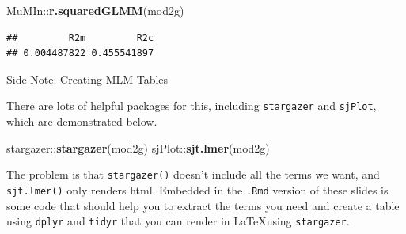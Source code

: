\documentclass[ignorenonframetext,]{beamer}
\newenvironment{Shaded}{\begin{snugshade}}{\end{snugshade}}
\newcommand{\KeywordTok}[1]{\textcolor[rgb]{0.13,0.29,0.53}{\textbf{{#1}}}}
\newcommand{\NormalTok}[1]{{#1}}
\begin{document}
\begin{frame}[fragile]

\small

\begin{Shaded}
\begin{Highlighting}[]
\NormalTok{MuMIn::}\KeywordTok{r.squaredGLMM}\NormalTok{(mod2g)}
\end{Highlighting}
\end{Shaded}

\begin{verbatim}
##         R2m         R2c 
## 0.004487822 0.455541897
\end{verbatim}

\normalsize

\end{frame}

\begin{frame}[fragile]{Side Note: Creating MLM Tables}

There are lots of helpful packages for this, including
\texttt{stargazer} and \texttt{sjPlot}, which are demonstrated below.\\
\tiny

\begin{Shaded}
\begin{Highlighting}[]
\NormalTok{stargazer::}\KeywordTok{stargazer}\NormalTok{(mod2g)}
\NormalTok{sjPlot::}\KeywordTok{sjt.lmer}\NormalTok{(mod2g)}
\end{Highlighting}
\end{Shaded}

The problem is that \texttt{stargazer()} doesn't include all the terms
we want, and \texttt{sjt.lmer()} only renders html. Embedded in the
\texttt{.Rmd} version of these slides is some code that should help you
to extract the terms you need and create a table using \texttt{dplyr}
and \texttt{tidyr} that you can render in \LaTeX using
\texttt{stargazer}.

\normalsize

\end{frame}
\end{document}
